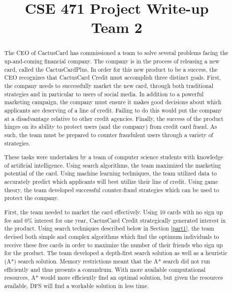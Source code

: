 \documentclass[11pt,journal]{IEEEtran}
\begin{document}
\title{CSE 471 Project Write-up \\ Team 2}

\author{
}

\maketitle

\renewcommand{\abstractname}{Executive Summary}
\begin{abstract}
The CEO of CactusCard has commissioned a team to solve several problems facing the up-and-coming financial company. The company is in the process of releasing a new card, called the CactusCardPlus. In order for this new product to be a success, the CEO recognizes that CactusCard Credit must accomplish three distinct goals. First, the company needs to successfully market the new card, through both traditional strategies and in particular to users of social media. In addition to a powerful marketing campaign, the company must ensure it makes good decisions about which applicants are deserving of a line of credit. Failing to do this would put the company at a disadvantage relative to other credit agencies. Finally, the success of the product hinges on its ability to protect users (and the company) from credit card fraud. As such, the team must be prepared to counter fraudulent users through a variety of strategies.
\par
These tasks were undertaken by a team of computer science students with knowledge of artificial intelligence. Using search algorithms, the team maximized the marketing potential of the card. Using machine learning techniques, the team utilized data to accurately predict which applicants will best utilize their line of credit. Using game theory, the team developed successful counter-fraud strategies which can be used to protect the company. 
\par
First, the team needed to market the card effectively. Using 10 cards with no sign up fee and 0\% interest for one year, CactusCard Credit strategically generated interest in the product. Using search techniques described below in Section \ref{part1}, the team devised both simple and complex algorithms which find the optimum individuals to receive these free cards in order to maximize the number of their friends who sign up for the product. The team developed a depth-first search solution as well as a heuristic (A*) search solution. Memory restrictions meant that the A* search did not run efficiently and thus presents a conundrum. With more available computational resources, A* would more efficiently find an optimal solution, but given the resources available, DFS will find a workable solution in less time.

\end{abstract}
\end{document}
